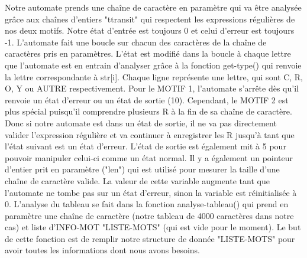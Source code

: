 \documentclass{article}
\begin{document}
Notre automate prends une chaîne de caractère en paramètre qui va être analysée grâce aux chaînes d'entiers "ttransit" qui respectent les expressions régulières de nos deux motifs. Notre état d'entrée est toujours 0 et celui d'erreur est toujours -1. L'automate fait une boucle sur chacun des caractères de la chaîne de caractères pris en paramètres. L'état est modifié dans la boucle à chaque lettre que l'automate est en entrain d'analyser grâce à la fonction get-type() qui renvoie la lettre correspondante à str[i]. Chaque ligne représente une lettre, qui sont C, R, O, Y ou AUTRE respectivement. Pour le MOTIF 1, l'automate s'arrête dès qu'il renvoie un état d'erreur ou un état de sortie (10). Cependant, le MOTIF 2 est plus spécial puisqu'il comprendre plusieurs R à la fin de sa chaîne de caractère. Donc si notre automate est dans un état de sortie, il ne va pas directement valider l'expression régulière et va continuer à enregistrer les R jusqu'à tant que l'état suivant est un état d'erreur. L'état de sortie est également mit à 5 pour pouvoir manipuler celui-ci comme un état normal. Il y a également un pointeur d'entier prit en paramètre ("len") qui est utilisé pour mesurer la taille d'une chaîne de caractère valide. La valeur de cette variable augmente tant que l'automate ne tombe pas sur un état d'erreur, sinon la variable est réinitialisée à 0.\newline\newline
L'analyse du tableau se fait dans la fonction analyse-tableau() qui prend en paramètre une chaîne de caractère (notre tableau de 4000 caractères dans notre cas) et liste d'INFO-MOT "LISTE-MOTS" (qui est vide pour le moment). Le but de cette fonction est de remplir notre structure de donnée "LISTE-MOTS" pour avoir toutes les informations dont nous avons besoins.\newline
\end{document}
